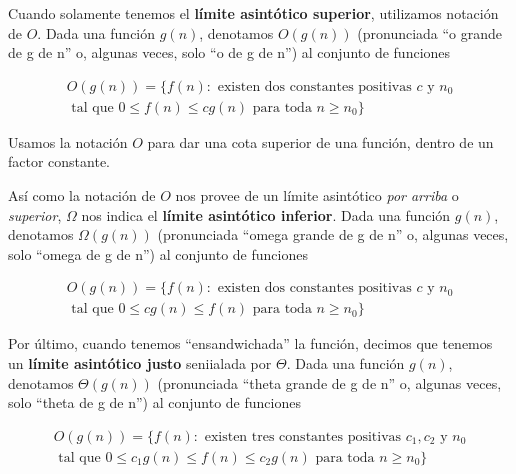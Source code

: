 \begin{definition}[Notaci\'on $O$]
Cuando solamente tenemos el \textbf{l\'imite asint\'otico superior}, utilizamos notaci\'on de $O$. Dada una funci\'on $g(n)$, denotamos $O(g(n))$ (pronunciada ``o grande de g de n'' o, algunas veces, solo ``o de g de n'') al conjunto de funciones
\end{definition}

\begin{equation*}
\begin{split}
O(g(n)) = \{f(n): \text{ existen dos constantes positivas } c \text{ y } n_0 \\
\text{ tal que } 0 \leq f(n) \leq cg(n) \text{ para toda } n \geq n_0\}
\end{split}
\end{equation*}

Usamos la notaci\'on $O$ para dar una cota superior de una funci\'on, dentro de un factor constante.

\begin{definition}

As\'i como la notaci\'on de $O$ nos provee de un l\'imite asint\'otico \textit{por arriba} o \textit{superior}, $\Omega$ nos indica el \textbf{l\'imite asint\'otico inferior}. Dada una funci\'on $g(n)$, denotamos $\Omega(g(n))$ (pronunciada ``omega grande de g de n'' o, algunas veces, solo ``omega de g de n'') al conjunto de funciones
\end{definition}

\begin{equation*}
\begin{split}
O(g(n)) = \{f(n): \text{ existen dos constantes positivas } c \text{ y } n_0 \\ \text{ tal que } 0 \leq cg(n) \leq f(n) \text{ para toda } n \geq n_0\}
\end{split}
\end{equation*}

\begin{definition}

Por \'ultimo, cuando tenemos ``ensandwichada'' la funci\'on, decimos que tenemos un \textbf{l\'imite asint\'otico justo} seniialada por $\Theta$. Dada una funci\'on $g(n)$, denotamos $\Theta(g(n))$ (pronunciada ``theta grande de g de n'' o, algunas veces, solo ``theta de g de n'') al conjunto de funciones

\begin{equation*}
\begin{split}
O(g(n)) = \{f(n): \text{ existen tres constantes positivas } c_1, c_2 \text{ y } n_0 \\
\text{ tal que } 0 \leq c_1g(n) \leq f(n) \leq c_2g(n) \text{ para toda } n \geq n_0\}
\end{split}
\end{equation*}
\end{definition}
